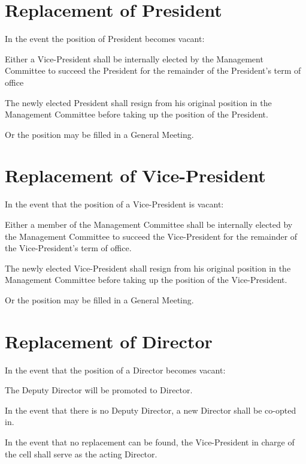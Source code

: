 \section{Replacement of President}
In the event the position of President becomes vacant:
	\begin{legal}
	\item Either a Vice-President shall be internally elected by the Management Committee to succeed the President for the remainder of the President's term of office
		\begin{legal}
		\item The newly elected President shall resign from his original position in the Management Committee before taking up the position of the President.
		\end{legal}
	\item Or the position may be filled in a General Meeting.
	\end{legal}

\section{Replacement of Vice-President}
In the event that the position of a Vice-President is vacant:
	\begin{legal}
	\item Either a member of the Management Committee shall be internally elected by the Management Committee to succeed the Vice-President for the remainder of the Vice-President's term of office.
	\begin{legal}
		\item The newly elected Vice-President shall resign from his original position in the Management Committee before taking up the position of the Vice-President.
	\end{legal}
	\item Or the position may be filled in a General Meeting.
	\end{legal}

\section{Replacement of Director}
In the event that the position of a Director becomes vacant:
	\begin{legal}
	\item The Deputy Director will be promoted to Director.
	\item In the event that there is no Deputy Director, a new Director shall be co-opted in.
	\item In the event that no replacement can be found, the Vice-President in charge of the cell shall serve as the acting Director.
	\end{legal}

